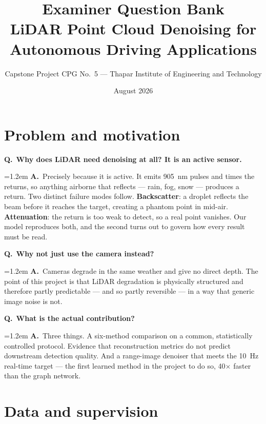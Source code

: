 \documentclass[11pt,a4paper]{article}
\title{\vspace{-1.6cm}\Large\bfseries Examiner Question Bank\\[4pt]
\large LiDAR Point Cloud Denoising for Autonomous Driving Applications}
\author{Capstone Project CPG No.~5 --- Thapar Institute of Engineering and Technology}
\date{August 2026}
\newcommand{\Q}[1]{\medskip\noindent\textcolor{qcol}{\textbf{Q.}}\ \textbf{#1}\par\nopagebreak}
\newcommand{\A}[1]{\noindent\hangindent=1.2em\hangafter=0 \textcolor{inkcol}{\textbf{A.}}\ #1\par}
\begin{document}
\maketitle
\vspace{-0.5cm}

\begin{center}
\end{center}

\section{Problem and motivation}

\Q{Why does LiDAR need denoising at all? It is an active sensor.}
\A{Precisely because it is active. It emits 905~nm pulses and times the
returns, so anything airborne that reflects --- rain, fog, snow --- produces
a return. Two distinct failure modes follow. \textbf{Backscatter}: a droplet
reflects the beam before it reaches the target, creating a phantom point in
mid-air. \textbf{Attenuation}: the return is too weak to detect, so a real
point vanishes. Our model reproduces both, and the second turns out to
govern how every result must be read.}

\Q{Why not just use the camera instead?}
\A{Cameras degrade in the same weather and give no direct depth. The point of
this project is that LiDAR degradation is physically structured and therefore
partly predictable --- and so partly reversible --- in a way that generic
image noise is not.}

\Q{What is the actual contribution?}
\A{Three things. A six-method comparison on a common, statistically
controlled protocol. Evidence that reconstruction metrics do not predict
downstream detection quality. And a range-image denoiser that meets the
10~Hz real-time target --- the first learned method in the project to do so,
40$\times$ faster than the graph network.}

\section{Data and supervision}
\end{document}
